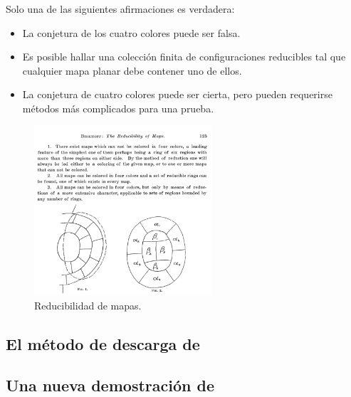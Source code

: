 \documentclass[spanish, utf8,handout]{beamer} %
\theoremstyle{definition}
\begin{document}
\begin{frame}
\frametitle{\insertsubsection}

\begin{minipage}[c]{4.7cm}
\begin{theorem}\textnormal
Solo una de las siguientes afirmaciones es verdadera:
\begin{itemize}%
	\item \small{La conjetura de los cuatro colores puede ser falsa.}
	\item \small{Es posible hallar una colección finita de configuraciones reducibles \linebreak tal que cualquier mapa planar debe contener uno \linebreak de ellos.}
	\item \small{La conjetura de cuatro colores puede ser cierta, pero pueden \linebreak requerirse métodos más complicados para una prueba.}
\end{itemize}
\end{theorem}
\end{minipage}
\begin{minipage}[c]{6.8cm}
\begin{figure}[H]
\centering
\includegraphics[width=6.6cm]{birkhoff}
\caption{Reducibilidad de mapas.}
\end{figure}
\end{minipage}
\end{frame}

\subsection{El método de descarga de \citeauthor{appel}}

\subsection{Una nueva demostración de \citeauthor{robertson}}
\end{document}
